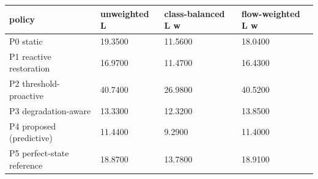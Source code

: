 \begin{tabular}{llll}
\toprule
policy & unweighted L & class-balanced L w & flow-weighted L w \\
\midrule
P0 static & 19.3500 & 11.5600 & 18.0400 \\
P1 reactive restoration & 16.9700 & 11.4700 & 16.4300 \\
P2 threshold-proactive & 40.7400 & 26.9800 & 40.5200 \\
P3 degradation-aware & 13.3300 & 12.3200 & 13.8500 \\
P4 proposed (predictive) & 11.4400 & 9.2900 & 11.4000 \\
P5 perfect-state reference & 18.8700 & 13.7800 & 18.9100 \\
\bottomrule
\end{tabular}
